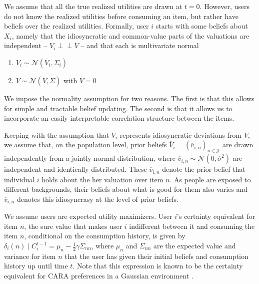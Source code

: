 \documentclass[format=acmsmall, review=false]{acmart}
\newcommand{\xhdr}[1]{\vspace{1mm} \noindent{\bf #1}}
\begin{document}
\xhdr{User Beliefs.} We assume that all the true realized utilities are drawn at $t = 0$. However, users do not know the realized utilities before consuming an item, but rather have beliefs over the realized utilities.
Formally, user $i$ starts with some beliefs about $X_i$, namely that the idiosyncratic and common-value parts of the valuations are independent -- $V_i \perp \!\!\! \perp V$ -- and that each is multivariate normal 
\begin{enumerate}
\item $V_i \sim \mathcal N (\overline V_i, \Sigma_i)$ 
\item $V \sim \mathcal N(\overline V, \Sigma)$ with $\overline V =0$
\end{enumerate}
We impose the normality assumption for two reasons. The first is that this allows for simple and tractable belief updating. The second is that it allows us to incorporate an easily interpretable correlation structure between the items.
\par
Keeping with the assumption that $V_i$ represents idiosyncratic deviations from $V$, we assume that, on the population level, prior beliefs $\overline V_i=\left(\overline v_{i,n}\right)_{n \in \mathcal{J}}$ are drawn independently from a jointly normal distribution, where $\overline v_{i,n} \sim \mathcal N (0, \overline \sigma^2)$ are independent and identically distributed. These $\overline v_{i,n}$ denote the prior belief that individual $i$ holds about the her valuation over item $n$. As people are exposed to different backgrounds, their beliefs about what is good for them also varies and $\overline v_{i,n}$ denotes this idiosyncrasy at the level of prior beliefs.
\par

We assume users are expected utility maximizers. User $i$'s certainty equivalent for item $n$, the sure value that makes user $i$ indifferent between it and consuming the item $n$, conditional on the consumption history, is given by
$\delta_{i}(n)\mid C_i^{t-1}=\mu_n-\frac{1}{2}\gamma \Sigma_{nn}$, where $\mu_n$ and $\Sigma_{nn}$ are the expected value and variance for item $n$ that the user has given their initial beliefs and consumption history up until time $t$. Note that this expression is known to be the certainty equivalent for CARA preferences in a Gaussian environment \cite{mas1995microeconomic}.
\end{document}
